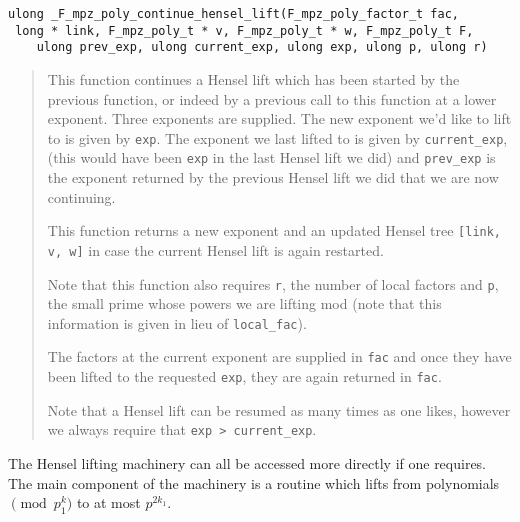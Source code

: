 \documentclass[a4paper,10pt]{article}
\newcommand{\code}{\lstinline}
\begin{document}
\begin{lstlisting}
ulong _F_mpz_poly_continue_hensel_lift(F_mpz_poly_factor_t fac, 
 long * link, F_mpz_poly_t * v, F_mpz_poly_t * w, F_mpz_poly_t F, 
    ulong prev_exp, ulong current_exp, ulong exp, ulong p, ulong r)
\end{lstlisting}
\begin{quote}
This function continues a Hensel lift which has been started by the previous function, or indeed by a
previous call to this function at a lower exponent. Three exponents are supplied. The new exponent we'd
like to lift to is given by \code{exp}. The exponent we last lifted to is given by \code{current_exp},
(this would have been \code{exp} in the last Hensel lift we did) and \code{prev_exp} is the exponent
returned by the previous Hensel lift we did that we are now continuing.

This function returns a new exponent and an updated Hensel tree \code{[link, v, w]} in case the current
Hensel lift is again restarted.

Note that this function also requires \code{r}, the number of local factors and \code{p}, the small 
prime whose powers we are lifting mod (note that this information is given in lieu of \code{local_fac}). 

The factors at the current exponent are supplied in \code{fac} and once they have been lifted to the
requested \code{exp}, they are again returned in \code{fac}.

Note that a Hensel lift can be resumed as many times as one likes, however we always require that
\code{exp > current_exp}.
\end{quote}

The Hensel lifting machinery can all be accessed more directly if one requires. The main component of
the machinery is a routine which lifts from polynomials $\pmod{p^k_1}$ to at most $p^{2k_1}$. 
\end{document}
